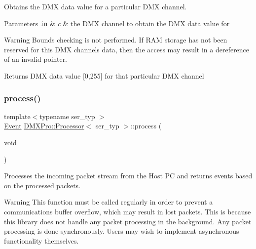 Obtains the D\+MX data value for a particular D\+MX channel. 


\begin{DoxyParams}[1]{Parameters}
\mbox{\tt in}  & {\em c} & the D\+MX channel to obtain the D\+MX data value for \\
\hline
\end{DoxyParams}
\begin{DoxyWarning}{Warning}
Bounds checking is not performed. If R\+AM storage has not been reserved for this D\+MX channel\textquotesingle{}s data, then the access may result in a dereference of an invalid pointer. 
\end{DoxyWarning}
\begin{DoxyReturn}{Returns}
D\+MX data value \mbox{[}0,255\mbox{]} for that particular D\+MX channel 
\end{DoxyReturn}
\mbox{\label{classDMXPro_1_1Processor_a3391d1ac0d213bdadbed8313d15584d6}} 
\subsubsection{\texorpdfstring{process()}{process()}}
{\footnotesize\ttfamily template$<$typename ser\+\_\+typ $>$ \\
\hyperlink{namespaceDMXPro_a0b4335b3ed2abbd803e6d33c54d6ac6d}{Event} \hyperlink{classDMXPro_1_1Processor}{D\+M\+X\+Pro\+::\+Processor}$<$ ser\+\_\+typ $>$\+::process (\begin{DoxyParamCaption}\item[{void}]{ }\end{DoxyParamCaption})\hspace{0.3cm}{\ttfamily [inline]}}



Processes the incoming packet stream from the Host PC and returns events based on the processed packets. 

\begin{DoxyWarning}{Warning}
This function must be called regularly in order to prevent a communications buffer overflow, which may result in lost packets. This is because this library does not handle any packet processing in the background. Any packet processing is done synchronously. Users may wish to implement asynchronous functionality themselves. 
\end{DoxyWarning}

